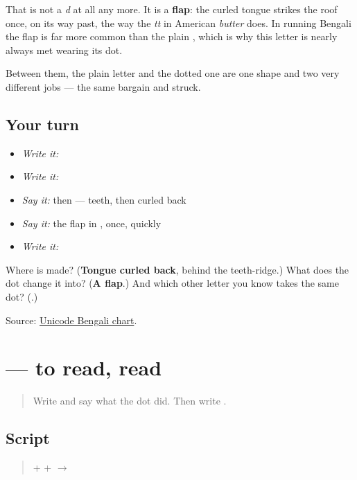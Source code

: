 That is not a \emph{d} at all any more. It is a \textbf{flap}: the curled tongue strikes the roof once, on its way past, the way the \emph{tt} in American \emph{butter} does. In running Bengali the flap is far more common than the plain \textbf{}, which is why this letter is nearly always met wearing its dot.

Between them, the plain letter and the dotted one are one shape and two very different jobs — the same bargain \textbf{} and \textbf{} struck.

\subsection*{Your turn}
\begin{itemize}
\raggedright
  \item \emph{Write it:} 
  \item \emph{Write it:} 
  \item \emph{Say it:} \textbf{} then \textbf{} — teeth, then curled back
  \item \emph{Say it:} the flap in \textbf{}, once, quickly
  \item \emph{Write it:}  
\end{itemize}

\begin{tcolorbox}[breakable,colback=teal!4,colframe=teal!35!black,title={Before you move on}]
Where is \textbf{} made? (\textbf{Tongue curled back}, behind the teeth-ridge.) What does the dot change it into? (\textbf{A flap}.) And which other letter you know takes the same dot? (\textbf{}.)

Source: \href{https://www.unicode.org/charts/PDF/U0980.pdf}{Unicode Bengali chart}.
\end{tcolorbox}
\section[\texorpdfstring{\bn{পড়া} (pôṛā)}{পড়া (pôṛā)}]{ — to read, read}

\label{lesson:BN-W04-pora-read}



\begin{quote}
Write \textbf{} and say what the dot did. Then write \textbf{}.
\end{quote}

\subsection*{Script}
\begin{quote}
\textbf{} + \textbf{} + \textbf{} $\to$ \textbf{}
\end{quote}

